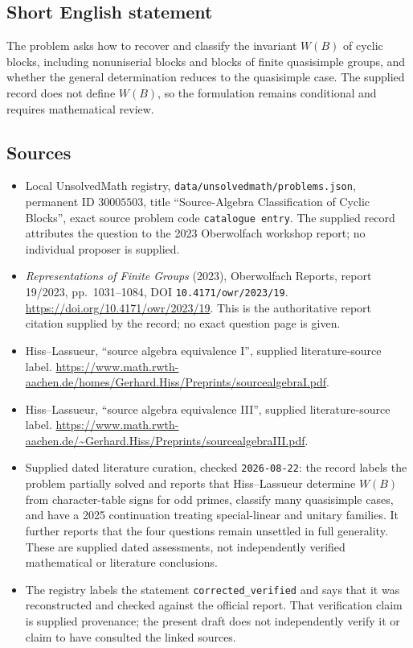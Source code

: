 \documentclass[11pt]{article}
\begin{document}
\subsection{Short English statement}
The problem asks how to recover and classify the invariant \(W(B)\) of cyclic blocks, including nonuniserial blocks and blocks of finite quasisimple groups, and whether the general determination reduces to the quasisimple case. The supplied record does not define \(W(B)\), so the formulation remains conditional and requires mathematical review.
\subsection{Sources}
\begin{itemize}
\item Local UnsolvedMath registry, \texttt{data/unsolvedmath/problems.json}, permanent ID \(30005503\), title ``Source-Algebra Classification of Cyclic Blocks'', exact source problem code \texttt{catalogue entry}. The supplied record attributes the question to the 2023 Oberwolfach workshop report; no individual proposer is supplied.
\item \emph{Representations of Finite Groups} (2023), Oberwolfach Reports, report 19/2023, pp.\ 1031--1084, DOI \texttt{10.4171/owr/2023/19}. \url{https://doi.org/10.4171/owr/2023/19}. This is the authoritative report citation supplied by the record; no exact question page is given.
\item Hiss--Lassueur, ``source algebra equivalence I'', supplied literature-source label. \url{https://www.math.rwth-aachen.de/homes/Gerhard.Hiss/Preprints/sourcealgebraI.pdf}.
\item Hiss--Lassueur, ``source algebra equivalence III'', supplied literature-source label. \url{https://www.math.rwth-aachen.de/~Gerhard.Hiss/Preprints/sourcealgebraIII.pdf}.
\item Supplied dated literature curation, checked \texttt{2026-08-22}: the record labels the problem partially solved and reports that Hiss--Lassueur determine \(W(B)\) from character-table signs for odd primes, classify many quasisimple cases, and have a 2025 continuation treating special-linear and unitary families. It further reports that the four questions remain unsettled in full generality. These are supplied dated assessments, not independently verified mathematical or literature conclusions.
\item The registry labels the statement \texttt{corrected\_verified} and says that it was reconstructed and checked against the official report. That verification claim is supplied provenance; the present draft does not independently verify it or claim to have consulted the linked sources.
\end{itemize}
\end{document}
